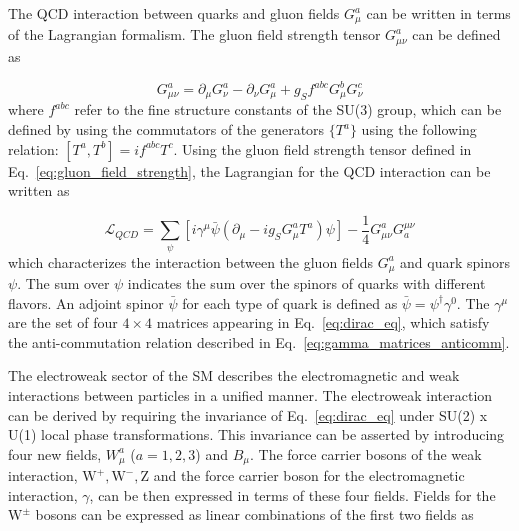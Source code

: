 The QCD interaction between quarks and gluon fields $G_{\mu}^{a}$ can be written in terms of the Lagrangian formalism.
The gluon field strength tensor $G_{\mu\nu}^a$ can be defined as

\begin{equation}
    G_{\mu\nu}^a = \partial_{\mu}G_{\nu}^a - \partial_{\nu}G_{\mu}^a + g_{S} f^{abc} G_{\mu}^{b} G_{\nu}^{c}
    \label{eq:gluon_field_strength}
\end{equation}
where $f^{abc}$ refer to the fine structure constants of the SU(3) group, which can be defined by using the
commutators of the generators $\{ T^{a} \}$ using the following relation: 
$[ T^{a}, T^{b} ] = i f^{abc} T^{c}$. 
Using the gluon field strength tensor defined in Eq.~\ref{eq:gluon_field_strength}, 
the Lagrangian for the QCD interaction can be written as


\begin{equation}
    \mathcal{L}_{QCD} = \sum_{\psi} \left[ i \gamma^{\mu} \bar{\psi} \left( \partial_{\mu} - i g_{S} G_{\mu}^{a} T^{a} \right) \psi \right] - \frac{1}{4} G_{\mu\nu}^{a} G^{\mu\nu}_{a}
\end{equation}
which characterizes the interaction between the gluon fields $G_{\mu}^{a}$ and quark spinors $\psi$.
The sum over $\psi$ indicates the sum over the spinors of quarks with different flavors.
An adjoint spinor $\bar{\psi}$ for each type of quark is defined as $\bar{\psi} = \psi^{\dag} \gamma^0$.
The $\gamma^{\mu}$ are the set of four $4 \times 4$ matrices appearing in Eq.~\ref{eq:dirac_eq}, which satisfy the
anti-commutation relation described in Eq.~\ref{eq:gamma_matrices_anticomm}. 

The electroweak sector of the SM describes the electromagnetic and weak interactions between particles in a unified manner. The electroweak interaction
can be derived by requiring the invariance of Eq.~\ref{eq:dirac_eq} under SU(2) x U(1) local phase transformations. 
This invariance can be asserted by introducing four
new fields, $W_{\mu}^{a}$ ($a = 1, 2, 3$) and $B_{\mu}$. The force carrier bosons of the weak interaction, $\textrm{W}^{+}, \textrm{W}^{-}, \textrm{Z}$ 
and the force carrier boson 
for the electromagnetic interaction, $\gamma$, can be then expressed in terms of these four fields. Fields for the $\textrm{W}^{\pm}$ bosons can be expressed as
linear combinations of the first two fields as

